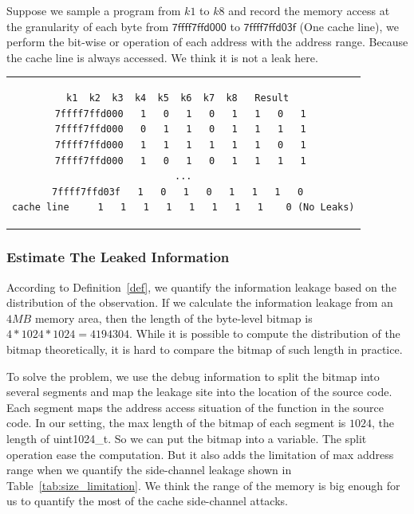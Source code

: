 \begin{myexample}
Suppose we sample a program from $k1$ to $k8$ and record the memory access at the granularity of each byte from $\mathsf{7ffff7ffd000}$ to $\mathsf{7ffff7ffd03f}$ (One cache line), we perform the bit-wise or operation of each address with the address range. Because the cache line is always accessed. We think it is not a leak here.
\begin{center}
\begin{tabular}{c}
{
\begin{lstlisting}[frame=none]
              k1  k2  k3  k4  k5  k6  k7  k8   Result  
7ffff7ffd000   1   0   1   0   1   1   0   1 
7ffff7ffd000   0   1   1   0   1   1   1   1 
7ffff7ffd000   1   1   1   1   1   1   0   1 
7ffff7ffd000   1   0   1   0   1   1   1   1 
...
7ffff7ffd03f   1   0   1   0   1   1   1   0  
cache line     1   1   1   1   1   1   1   1    0 (No Leaks)
\end{lstlisting}
}
\end{tabular}
\end{center}
\end{myexample}

\subsubsection{Estimate The Leaked Information}
According to Definition~\ref{def}, we quantify the information leakage based on the distribution of the observation. If we calculate the information leakage from an $4MB$ memory area, then the length of the byte-level bitmap is $4*1024*1024 = 4194304$. While it is possible to compute the distribution of the bitmap theoretically, it is hard to compare the bitmap of such length in practice.

To solve the problem, we use the debug information to split the bitmap into several segments and map the leakage site into the location of the source code. Each segment maps the address access situation of the function in the source code. In our setting, the max length of the bitmap of each segment is $1024$, the length of \textsf{uint1024\_t}. So we can put the bitmap into a variable. The split operation ease the computation. But it also adds the limitation of max address range when we quantify the side-channel leakage shown in Table~\ref{tab:size_limitation}. We think the range of the memory is big enough for us to quantify the most of the cache side-channel attacks. 

\begin{table}[h]
    \centering
{}
    \caption{The maximum range address range when we quantify the amount of the leakage with different granularity.}
    \label{tab:size_limitation}
\end{table}

